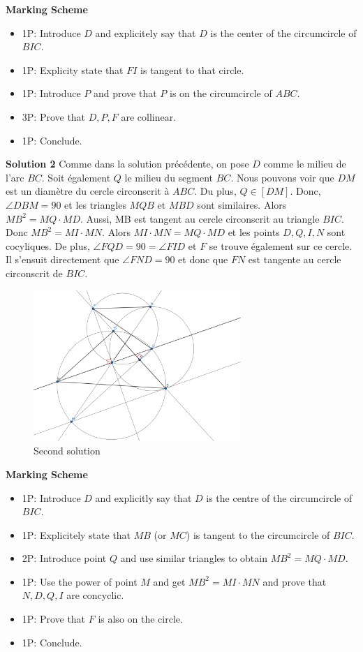 \textbf{Marking Scheme}

\begin{itemize}
\item 1P: Introduce $D$ and explicitely say that $D$ is the center of the circumcircle of $BIC$.
\item 1P: Explicity state that $FI$ is tangent to that circle.
\item 1P: Introduce $P$ and prove that $P$ is on the circumcircle of $ABC$.
\item 3P: Prove that $D,P,F$ are collinear.
\item 1P: Conclude.
\end{itemize}

\newpage

\textbf{Solution 2}
Comme dans la solution précédente, on pose $D$ comme le milieu de l'arc $BC$. Soit également $Q$ le milieu du segment $BC$. Nous pouvons voir que $DM$ est un diamètre du cercle circonscrit à $ABC$. Du plus, $Q \in [DM]$. Donc, $\angle DBM = 90$ et les triangles $MQB$ et $MBD$ sont similaires. Alors $MB^2 = MQ \cdot MD$. Aussi, MB est tangent au cercle circonscrit au triangle $BIC$. Donc $MB^2 = MI \cdot MN$. Alors $MI \cdot MN = MQ \cdot MD$ et les points $D,Q,I,N$ sont cocyliques. De plus, $\angle FQD = 90 = \angle FID$ et $F$ se trouve également sur ce cercle. Il s'ensuit directement que $\angle FND = 90$ et donc que $FN$ est tangente au cercle circonscrit de $BIC$.
\begin{figure}[h!]
    \centering
    \includegraphics[width = 0.7\textwidth]{solutions/P8_2.png}
    \caption{Second solution}
\end{figure}

\textbf{Marking Scheme} 

\begin{itemize}
\item 1P: Introduce $D$ and explicitly say that $D$ is the centre of the circumcircle of $BIC$.
\item 1P: Explicitely state that $MB$ (or $MC$) is tangent to the circumcircle of $BIC$.
\item 2P: Introduce point $Q$ and use similar triangles to obtain $MB^2 = MQ \cdot MD$.
\item 1P: Use the power of point $M$ and get $MB^2 = MI \cdot MN$ and prove that $N,D,Q,I$ are concyclic.
\item 1P: Prove that $F$ is also on the circle.
\item 1P: Conclude.

\end{itemize}

